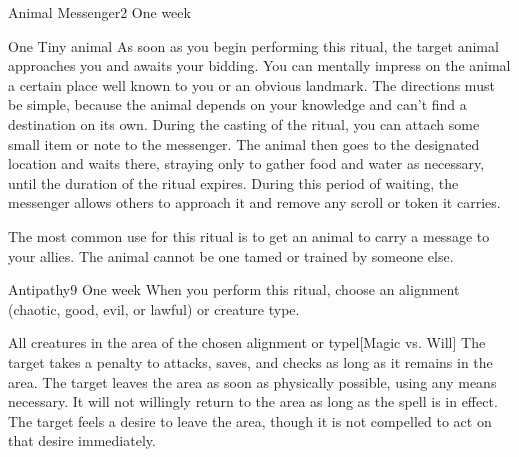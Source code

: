 \begin{spellsection}{Animal Messenger}{2}
\spellrng{\rnglong}
\spelldur One week
\begin{spelltarget}{One Tiny animal}
    \spelleffect As soon as you begin performing this ritual, the target animal approaches you and awaits your bidding. You can mentally impress on the animal a certain place well known to you or an obvious landmark. The directions must be simple, because the animal depends on your knowledge and can't find a destination on its own. During the casting of the ritual, you can attach some small item or note to the messenger. The animal then goes to the designated location and waits there, straying only to gather food and water as necessary, until the duration of the ritual expires. During this period of waiting, the messenger allows others to approach it and remove any scroll or token it carries.
\end{spelltarget}
\spellnotes The most common use for this ritual is to get an animal to carry a message to your allies. The animal cannot be one tamed or trained by someone else.
\end{spellsection}

\begin{spellsection}{Antipathy}{9}
\spelldur One week \dismissable
\spellspecial When you perform this ritual, choose an alignment (chaotic, good, evil, or lawful) or creature type.
\begin{spelltargets}{All creatures in the area of the chosen alignment or type}l[Magic vs. Will]
    \spelleffect The target takes a  penalty to attacks, saves, and checks as long as it remains in the area.
    \spellsuccess The target leaves the area as soon as physically possible, using any means necessary. It will not willingly return to the area as long as the spell is in effect.
    \spellfailure The target feels a desire to leave the area, though it is not compelled to act on that desire immediately.
\end{spelltargets}
\end{spellsection}

